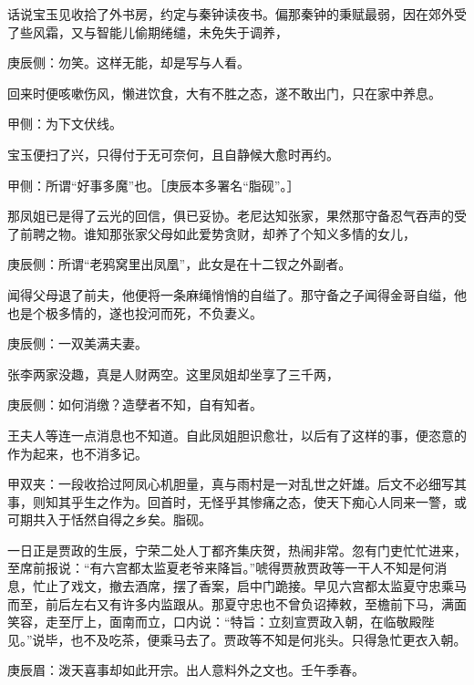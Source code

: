 \begin{parag}
    话说宝玉见收拾了外书房，约定与秦钟读夜书。偏那秦钟的秉赋最弱，因在郊外受了些风霜，又与智能儿偷期绻缱，未免失于调养，\begin{note}庚辰侧：勿笑。这样无能，却是写与人看。\end{note}回来时便咳嗽伤风，懒进饮食，大有不胜之态，遂不敢出门，只在家中养息。\begin{note}甲侧：为下文伏线。\end{note}宝玉便扫了兴，只得付于无可奈何，且自静候大愈时再约。\begin{note}甲侧：所谓“好事多魔”也。［庚辰本多署名“脂砚”。］\end{note}
\end{parag}


\begin{parag}
    那凤姐已是得了云光的回信，俱已妥协。老尼达知张家，果然那守备忍气吞声的受了前聘之物。谁知那张家父母如此爱势贪财，却养了个知义多情的女儿，\begin{note}庚辰侧：所谓“老鸦窝里出凤凰”，此女是在十二钗之外副者。\end{note}闻得父母退了前夫，他便将一条麻绳悄悄的自缢了。那守备之子闻得金哥自缢，他也是个极多情的，遂也投河而死，不负妻义。\begin{note}庚辰侧：一双美满夫妻。\end{note}张李两家没趣，真是人财两空。这里凤姐却坐享了三千两，\begin{note}庚辰侧：如何消缴？造孽者不知，自有知者。\end{note}王夫人等连一点消息也不知道。自此凤姐胆识愈壮，以后有了这样的事，便恣意的作为起来，也不消多记。\begin{note}甲双夹：一段收拾过阿凤心机胆量，真与雨村是一对乱世之奸雄。后文不必细写其事，则知其乎生之作为。回首时，无怪乎其惨痛之态，使天下痴心人同来一警，或可期共入于恬然自得之乡矣。脂砚。\end{note}
\end{parag}


\begin{parag}
    一日正是贾政的生辰，宁荣二处人丁都齐集庆贺，热闹非常。忽有门吏忙忙进来，至席前报说：“有六宫都太监夏老爷来降旨。”唬得贾赦贾政等一干人不知是何消息，忙止了戏文，撤去酒席，摆了香案，启中门跪接。早见六宫都太监夏守忠乘马而至，前后左右又有许多内监跟从。那夏守忠也不曾负诏捧敕，至檐前下马，满面笑容，走至厅上，面南而立，口内说：“特旨：立刻宣贾政入朝，在临敬殿陛见。”说毕，也不及吃茶，便乘马去了。贾政等不知是何兆头。只得急忙更衣入朝。\begin{note}庚辰眉：泼天喜事却如此开宗。出人意料外之文也。壬午季春。\end{note}
\end{parag}



